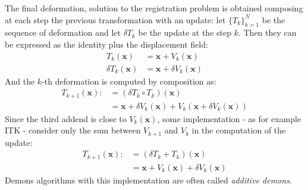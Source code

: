 The final deformation, solution to the registration problem is obtained composing at each step the previous transformation with an update: let $\{T_{k}\}_{k=1}^{N}$ be the sequence of deformation and let $\delta T_{k}$ be the update at the step $k$. Then they can be expressed as the identity plus the displacement field:
\begin{align*}
	T_{k}(\mathbf{x}) &= \mathbf{x} + V_{k}(\mathbf{x}) \\ 
	\delta T_{k}(\mathbf{x}) &= \mathbf{x} + \delta V_{k}(\mathbf{x}) 
\end{align*}
And the $k$-th deformation is computed by composition as:
\begin{align*}
T_{k+1}(\mathbf{x})  :&= (\delta T_{k}\circ T_{k})(\mathbf{x}) \\
&= \mathbf{x} + \delta V_{k}(\mathbf{x}) + V_{k}(\mathbf{x} + \delta V_{k}(\mathbf{x}))
\end{align*}
Since the third addend is close to $V_{k}(\mathbf{x})$, some implementation - as for example ITK - consider only the sum between 
$ V_{k+1}$ and $V_{k}$ in the computation of the update:
\begin{align*}
T_{k+1}(\mathbf{x})  :&= (\delta T_{k} + T_{k})(\mathbf{x}) \\
&= \mathbf{x} + V_{k}(\mathbf{x}) + \delta V_{k}(\mathbf{x})
\end{align*}
Demons algorithms with this implementation are often called \emph{additive demons}.\\

